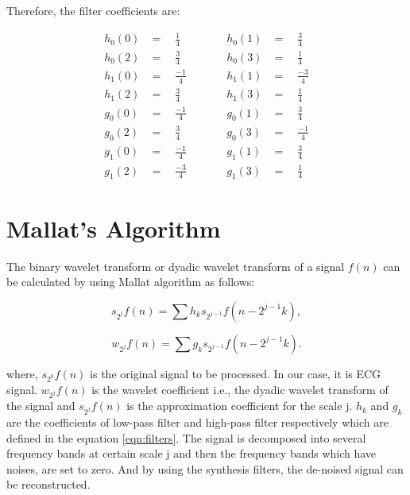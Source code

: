 Therefore, the filter coefficients are:

\begin{equation}
\label{eqn:filters}
\begin{aligned}
		h_0(0) & =  \quad \frac{1}{4}    & \quad &\quad  h_0(1) &= \quad \frac{3}{4} \\
		h_0(2) & =  \quad \frac{3}{4}    & \quad &\quad   h_0(3) &= \quad \frac{1}{4} \\[1ex]
		h_1(0) & =  \quad \frac{- 1}{4}  & \quad &\quad   h_1(1) &= \quad \frac{-3}{4} \\
		h_1(2) & =  \quad \frac{3}{4}    & \quad &\quad   h_1(3) &= \quad \frac{1}{4} \\[1ex]
		g_0(0) & =  \quad \frac{-1}{4}   & \quad &\quad   g_0(1) &= \quad \frac{3}{4} \\
		g_0(2) & =  \quad \frac{3}{4}    & \quad &\quad   g_0(3) &= \quad \frac{-1}{4} \\[1ex]
		g_1(0) & =  \quad \frac{-1}{4}   & \quad &\quad   g_1(1) &= \quad \frac{3}{4} \\
		g_1(2) & =  \quad \frac{-3}{4}   & \quad &\quad   g_1(3) &= \quad \frac{1}{4}
\end{aligned}
\end{equation}




\section{Mallat's Algorithm}
The binary wavelet transform or dyadic wavelet transform of a signal $f(n)$ can be calculated by using Mallat algorithm \cite{119727} as follows:

\begin{equation} 
{ s_{2^j}f(n) = \sum h_ks_{2^{j-1}}f(n - 2^{j-1}k),   }
\end{equation}

\begin{equation} 
{ w_{2^j}f(n) = \sum g_ks_{2^{j-1}}f(n - 2^{j-1}k).   }
\end{equation}

where, $s_{2^0}f(n)$ is the original signal to be processed. In our case, it is ECG signal. $w_{2^j}f(n)$ is the wavelet coefficient i.e., the dyadic wavelet transform of the signal and $s_{2^j}f(n)$ is the approximation coefficient for the scale j. $h_k$ and $g_k$ are the coefficients of low-pass filter and high-pass filter respectively which are defined in the equation \ref{eqn:filters}. The signal is decomposed into several frequency bands at certain scale j and then the frequency bands which have noises, are set to zero. And by using the synthesis filters, the de-noised signal can be reconstructed.



